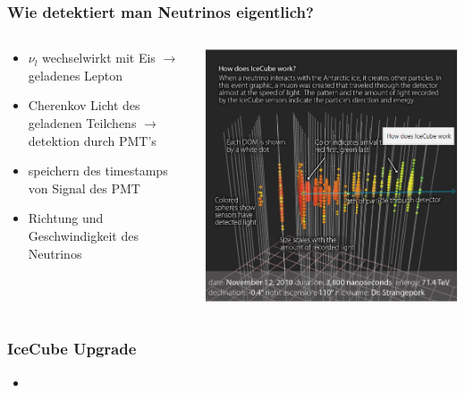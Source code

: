 \documentclass[aspectratio=1610, 9pt]{beamer}
\begin{document}
\begin{frame}\frametitle{Wie detektiert man Neutrinos eigentlich?}
  \begin{columns}
    \begin{column}[c]{0.45\textwidth}
      \begin{itemize}
      \item $\nu_{l}$ wechselwirkt mit Eis $\to$ geladenes Lepton
      \item Cherenkov Licht des geladenen Teilchens $\to$ detektion durch PMT's
      \item speichern des timestamps von Signal des PMT
      \item Richtung und Geschwindigkeit des Neutrinos
      \end{itemize}
    \end{column}
    \begin{column}[c]{0.45\textwidth}
      \includegraphics{images/signal_test.png}
    \end{column}
  \end{columns}
\end{frame}

\begin{frame}\frametitle{IceCube Upgrade}
  \begin{itemize}
    \item 
  \end{itemize}
\end{frame}
\end{document}
